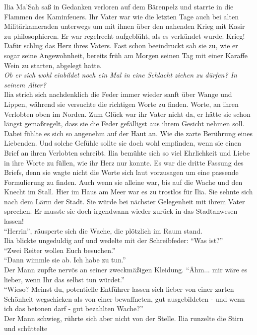 Ilia Ma'Sah saß in Gedanken verloren auf dem Bärenpelz und starrte in die Flammen des Kaminfeuers. 
Ihr Vater war wie die letzten Tage auch bei alten Militärkameraden unterwegs um mit ihnen über den 
nahenden Krieg mit Kasir zu philosophieren. Er war regelrecht aufgeblüht, als es verkündet wurde. 
Krieg! Dafür schlug das Herz ihres Vaters. Fast schon beeindruckt sah sie zu, wie er sogar seine 
Angewohnheit, bereits früh am Morgen seinen Tag mit einer Karaffe Wein zu starten, abgelegt hatte.\\
\textit{Ob er sich wohl einbildet noch ein Mal in eine Schlacht ziehen zu dürfen? In seinem 
Alter?}\\
Ilia strich sich nachdenklich die Feder immer wieder sanft über Wange und Lippen, während sie 
versuchte die richtigen Worte zu finden. Worte, an ihren Verlobten oben im Norden. Zum Glück war 
ihr Vater nicht da, er hätte sie schon längst gemaßregelt, dass sie die Feder gefälligst aus ihrem 
Gesicht nehmen soll. Dabei fühlte es sich so angenehm auf der Haut an. Wie die zarte Berührung 
eines Liebenden. Und solche Gefühle sollte sie doch wohl empfinden, wenn sie einen Brief an ihren 
Verlobten schreibt. Ilia bemühte sich so viel Ehrlichkeit und Liebe in ihre Worte zu füllen, wie 
ihr Herz nur konnte. Es war die dritte Fassung des Briefs, denn sie wagte nicht die Worte sich laut 
vorzusagen um eine passende Formulierung zu finden. Auch wenn sie alleine war, bis auf die Wache 
und den Knecht im Stall. Hier im Haus am Meer war es zu trostlos für Ilia. Sie sehnte sich nach dem 
Lärm der Stadt. Sie würde bei nächster Gelegenheit mit ihrem Vater sprechen. Er musste sie doch 
irgendwann wieder zurück in das Stadtanwesen lassen!\\
``Herrin'', räusperte sich die Wache, die plötzlich im Raum stand.\\
Ilia blickte ungeduldig auf und wedelte mit der Schreibfeder: ``Was ist?''\\
``Zwei Reiter wollen Euch besuchen.''\\
``Dann wimmle sie ab. Ich habe zu tun.''\\
Der Mann zupfte nervös an seiner zweckmäßigen Kleidung. ``Ähm... mir wäre es lieber, wenn Ihr das 
selbst tun würdet.''\\
``Wieso? Meinst du, potentielle Entführer lassen sich lieber von einer zarten Schönheit wegschicken 
als von einer bewaffneten, gut ausgebildeten - und wenn ich das betonen darf - gut bezahlten 
Wache?''\\
Der Mann schwieg, rührte sich aber nicht von der Stelle. Ilia runzelte die Stirn und schüttelte 
